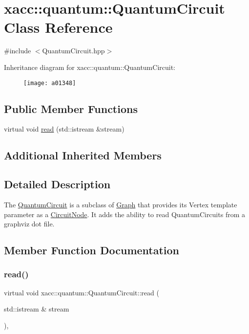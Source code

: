 \hypertarget{a01348}{}\section{xacc\+:\+:quantum\+:\+:Quantum\+Circuit Class Reference}
\label{a01348}


{\ttfamily \#include $<$Quantum\+Circuit.\+hpp$>$}

Inheritance diagram for xacc\+:\+:quantum\+:\+:Quantum\+Circuit\+:\begin{figure}[H]
\begin{center}
\leavevmode
\texttt{[image: a01348]}
\end{center}
\end{figure}
\subsection*{Public Member Functions}
\begin{DoxyCompactItemize}
\item 
virtual void \hyperlink{a01348_af7a7f4a487d493fe8a4ed1f76cefd731}{read} (std\+::istream \&stream)
\end{DoxyCompactItemize}
\subsection*{Additional Inherited Members}


\subsection{Detailed Description}
The \hyperlink{a01348}{Quantum\+Circuit} is a subclass of \hyperlink{a02528}{Graph} that provides its Vertex template parameter as a \hyperlink{a01292}{Circuit\+Node}. It adds the ability to read Quantum\+Circuits from a graphviz dot file. 

\subsection{Member Function Documentation}
\mbox{\label{a01348_af7a7f4a487d493fe8a4ed1f76cefd731}} 
\subsubsection{\texorpdfstring{read()}{read()}}
{\footnotesize\ttfamily virtual void xacc\+::quantum\+::\+Quantum\+Circuit\+::read (\begin{DoxyParamCaption}\item[{std\+::istream \&}]{stream }\end{DoxyParamCaption})\hspace{0.3cm}{\ttfamily [inline]}, {\ttfamily [virtual]}}

